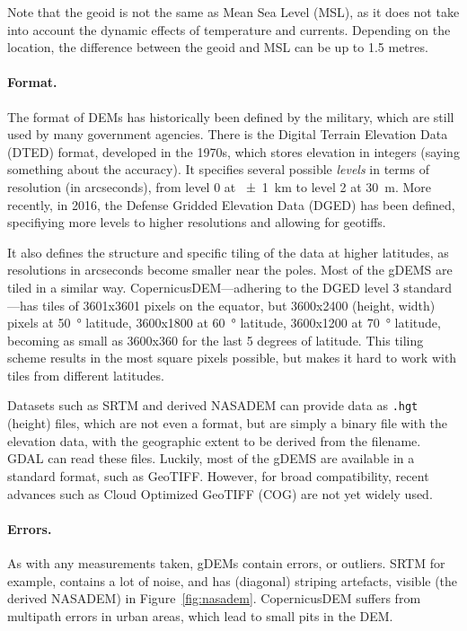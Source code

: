 Note that the geoid is not the same as Mean Sea Level (MSL), as it does not take into account the dynamic effects of temperature and currents.
Depending on the location, the difference between the geoid and MSL can be up to 1.5 metres.

\paragraph{Format.}  %
The format of DEMs has historically been defined by the military, which are still used by many government agencies.
There is the Digital Terrain Elevation Data (DTED) format, developed in the 1970s, which stores elevation in integers (saying something about the accuracy).
It specifies several possible \emph{levels} in terms of resolution (in arcseconds), from level 0 at \qty{\pm1}{km} to level 2 at \qty{30}{m}.
More recently, in 2016, the Defense Gridded Elevation Data (DGED) has been defined, specifiying more levels to higher resolutions and allowing for geotiffs.

It also defines the structure and specific tiling of the data at higher latitudes, as resolutions in arcseconds become smaller near the poles.
Most of the gDEMS are tiled in a similar way.
CopernicusDEM---adhering to the DGED level 3 standard---has tiles of 3601x3601 pixels on the equator, but 3600x2400 (height, width) pixels at \qty{50}{\degree} latitude, 3600x1800 at \qty{60}{\degree} latitude, 3600x1200 at \qty{70}{\degree} latitude, becoming as small as 3600x360 for the last 5 degrees of latitude.
This tiling scheme results in the most square pixels possible, but makes it hard to work with tiles from different latitudes.

Datasets such as SRTM and derived NASADEM can provide data as \texttt{.hgt} (height) files, which are not even a format, but are simply a binary file with the elevation data, with the geographic extent to be derived from the filename.
GDAL can read these files.
Luckily, most of the gDEMS are available in a standard format, such as GeoTIFF\@.
However, for broad compatibility, recent advances such as Cloud Optimized GeoTIFF (COG) are not yet widely used.


\paragraph{Errors.}
As with any measurements taken, gDEMs contain errors, or outliers.
SRTM for example, contains a lot of noise, and has (diagonal) striping artefacts, visible (the derived NASADEM) in Figure~\ref{fig:nasadem}.
CopernicusDEM suffers from multipath errors in urban areas, which lead to small pits in the DEM.

